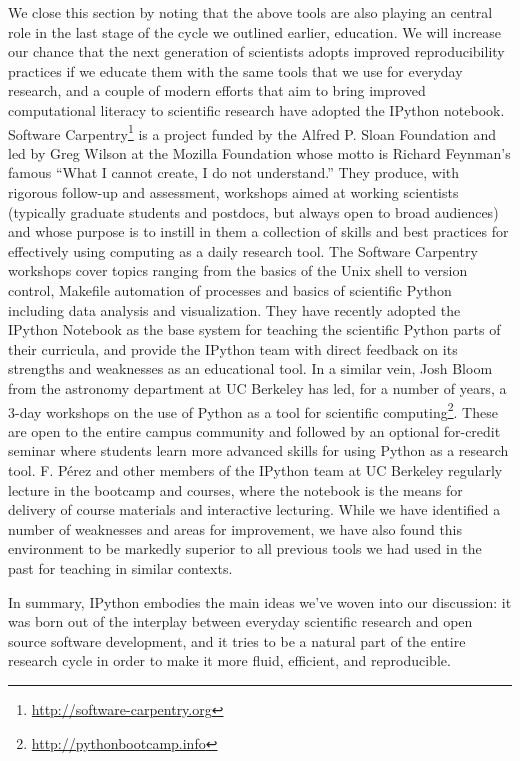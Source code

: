 \documentclass[ChapterTOCs,krantz2]{krantz} %
\begin{document}
We close this section by noting that the above tools are also playing an
central role in the last stage of the cycle we outlined earlier, education.  We
will increase our chance that the next generation of scientists adopts improved
reproducibility practices if we educate them with the same tools that we use
for everyday research, and a couple of modern efforts that aim to bring
improved computational literacy to scientific research have adopted the IPython
notebook.  Software Carpentry\footnote{\url{http://software-carpentry.org}} is
a project funded by the Alfred P. Sloan Foundation and led by Greg Wilson at
the Mozilla Foundation whose motto is Richard Feynman's famous ``What I cannot
create, I do not understand.''  They produce, with rigorous follow-up and
assessment, workshops aimed at working scientists (typically graduate students
and postdocs, but always open to broad audiences) and whose purpose is to
instill in them a collection of skills and best practices for effectively using
computing as a daily research tool.  The Software Carpentry workshops cover
topics ranging from the basics of the Unix shell to version control, Makefile
automation of processes and basics of scientific Python including data analysis
and visualization.  They have recently adopted the IPython Notebook as the base
system for teaching the scientific Python parts of their curricula, and provide
the IPython team with direct feedback on its strengths and weaknesses as an
educational tool.  In a similar vein, Josh Bloom from the astronomy department
at UC Berkeley has led, for a number of years, a 3-day workshops on the use of
Python as a tool for scientific
computing\footnote{\url{http://pythonbootcamp.info}}.  These are open to the
entire campus community and followed by an optional for-credit seminar where
students learn more advanced skills for using Python as a research tool.  F.
Pérez and other members of the IPython team at UC Berkeley regularly lecture in
the bootcamp and courses, where the notebook is the means for delivery of
course materials and interactive lecturing.  While we have identified a number
of weaknesses and areas for improvement, we have also found this environment to
be markedly superior to all previous tools we had used in the past for teaching
in similar contexts.

In summary, IPython embodies the main ideas we've woven into our discussion: it
was born out of the interplay between everyday scientific research and open
source software development, and it tries to be a natural part of the entire
research cycle in order to make it more fluid, efficient, and reproducible.
\end{document}
